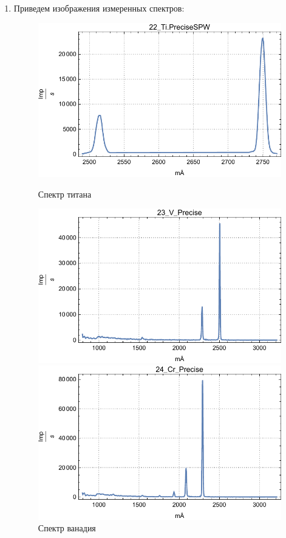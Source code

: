 \documentclass[a4paper, 12pt]{article}
\begin{document}
\begin{enumerate}
	\item Приведем изображения измеренных спектров:
	\begin{figure}[!htb]
		\includegraphics[width=\linewidth]{PhysLab5/22_Ti.PreciseSPW.pdf}
		\caption{Спектр титана}
		\endminipage\hfill
		\includegraphics[width=\linewidth]{PhysLab5/23_V_Precise.pdf}
		\caption{Спектр ванадия}
		\endminipage\hfill
		\includegraphics[width=\linewidth]{PhysLab5/24_Cr_Precise.pdf}

\end{figure}
\end{enumerate}
\end{document}
